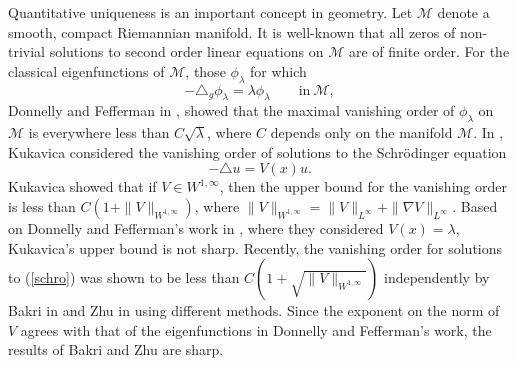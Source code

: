 \documentclass[11pt]{amsart}
\theoremstyle{plain}
\numberwithin{equation}{section}
\begin{document}
Quantitative uniqueness is an important concept in geometry.
Let $\mathcal{M}$ denote a smooth, compact Riemannian manifold.
It is well-known that all zeros of non-trivial solutions to second order linear equations on $\mathcal{M}$ are of finite order.
For the classical eigenfunctions of $\mathcal{M}$, those $\phi_{\lambda}$ for which
 $$-{\mbox{$\triangle$}}_{g} \phi_\lambda=\lambda \phi_\lambda \quad \quad \mbox{in} \ \mathcal{M},$$
Donnelly and Fefferman in \cite{DF88}, \cite{DF90} showed that the maximal vanishing order of $\phi_\lambda$ on $\mathcal{M}$ is everywhere less than $C\sqrt{\lambda}$, where $C$ depends only on the manifold $\mathcal{M}$.
In \cite{Kuk98}, Kukavica considered the vanishing order of solutions to the Schr\"{o}dinger equation
\begin{equation}
-{\mbox{$\triangle$}} u=V(x)u.
\label{schro}
\end{equation}
Kukavica showed that if $V \in W^{1, \infty}$, then the upper bound for the vanishing order is less than $C(1+\|V\|_{W^{1, \infty}})$, where $\|V\|_{W^{1, \infty}}=\|V\|_{L^\infty}+\|\nabla V\|_{L^\infty}$.
Based on Donnelly and Fefferman's work in \cite{DF88}, where they considered $V(x)=\lambda$, Kukavica's upper bound is not sharp.
Recently, the vanishing order for solutions to (\ref{schro}) was shown to be less than $C(1+\sqrt{\|V\|_{W^{1, \infty}}})$ independently by Bakri in \cite{Bak12} and Zhu in \cite{Zhu16} using different
methods.
Since the exponent on the norm of $V$ agrees with that of the eigenfunctions in Donnelly and Fefferman's work, the results of Bakri and Zhu are sharp.
\end{document}
